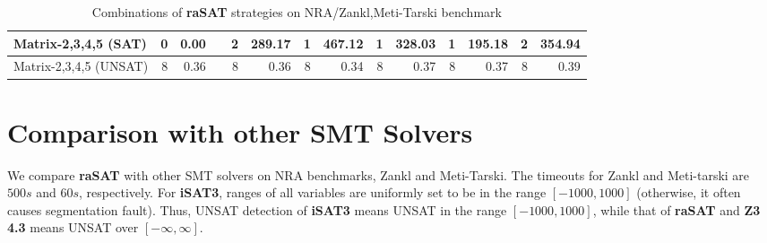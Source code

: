 \begin{table*}[t]
{\begin{tabular}{ | l | r | r  r | r | r  | r | r | r | r | r | r |r | r |}
\\
\hline
 Matrix-2,3,4,5 (SAT) & 0 & 0.00 && 2 & 289.17 & 1 & 467.12 & 1 & 328.03 & 1 & 195.18 & 2 & 354.94 
\\
\hline
 Matrix-2,3,4,5 (UNSAT) & 8 & 0.36 && 8 & 0.36 & 8 & 0.34 & 8 & 0.37 & 8 & 0.37 & 8 & 0.39 
\\
\hline
\end{tabular}
}
\bigskip
{}
\medskip
\caption{Combinations of {\bf raSAT} strategies on NRA/Zankl,Meti-Tarski benchmark} 
\label{tab:rasat-experiments}
\end{table*}


\section{Comparison with other SMT Solvers}

We compare {\bf raSAT} with other SMT solvers on NRA benchmarks, Zankl and Meti-Tarski. 
The timeouts for Zankl and Meti-tarski are $500s$ and $60s$, respectively. 
For {\bf iSAT3}, ranges of all variables are uniformly set to be in the range $[-1000, 1000]$
(otherwise, it often causes segmentation fault). 
Thus, UNSAT detection of {\bf iSAT3} means UNSAT in the range $[-1000, 1000]$, 
while that of {\bf raSAT} and {\bf Z3 4.3} means  UNSAT over $[-\infty, \infty]$. 

